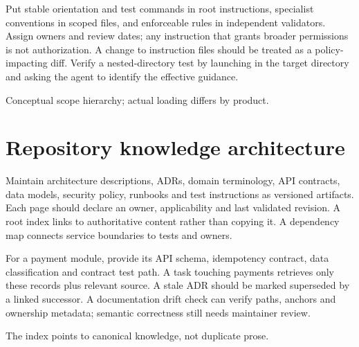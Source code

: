 \documentclass[11pt,letterpaper]{article}
\begin{document}
Put stable orientation and test commands in root instructions, specialist conventions in scoped files, and enforceable rules in independent validators. Assign owners and review dates; any instruction that grants broader permissions is not authorization. A change to instruction files should be treated as a policy-impacting diff. Verify a nested-directory test by launching in the target directory and asking the agent to identify the effective guidance.

\begin{center}\begin{minipage}{\linewidth}\captionsetup{type=figure}\centering{}\caption{Hierarchical instruction discovery}
\small Conceptual scope hierarchy; actual loading differs by product.\end{minipage}\end{center}
\section{Repository knowledge architecture}
Maintain architecture descriptions, ADRs, domain terminology, API contracts, data models, security policy, runbooks and test instructions as versioned artifacts. Each page should declare an owner, applicability and last validated revision. A root index links to authoritative content rather than copying it. A dependency map connects service boundaries to tests and owners.

For a payment module, provide its API schema, idempotency contract, data classification and contract test path. A task touching payments retrieves only these records plus relevant source. A stale ADR should be marked superseded by a linked successor. A documentation drift check can verify paths, anchors and ownership metadata; semantic correctness still needs maintainer review.

\begin{center}\begin{minipage}{\linewidth}\captionsetup{type=figure}\centering{}\caption{Repository knowledge architecture}
\small The index points to canonical knowledge, not duplicate prose.\end{minipage}\end{center}
\end{document}
